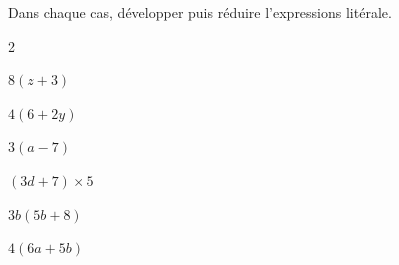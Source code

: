 \documentclass[exercice]{thedocument}%
\begin{document}
%
Dans chaque cas, développer puis réduire l'expressions litérale.
\begin{enumerate}
    \begin{multicols}{2}
        \item $8(z+3)$
        \item $4(6+2y)$
        \item $3(a-7)$
        \columnbreak
        \item $(3d+7)\times 5$
        \item $3b(5b+8)$
        \item $4(6a+5b)$
    \end{multicols}
\end{enumerate}
\end{document}

